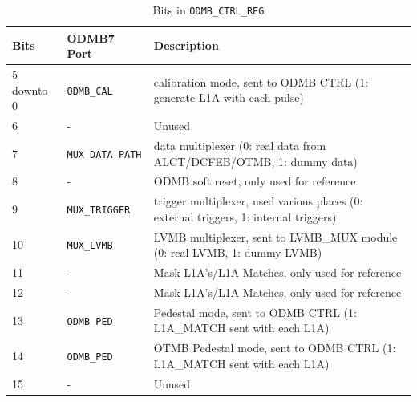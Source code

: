 \documentclass[10pt,a4paper]{article}
\begin{document}
\begin{table}[H]
\centering
\begin{tabular}{|l|l|l|} \hline
Bits& ODMB7 Port& Description\\ \hline
5 downto 0& \texttt{ODMB\_CAL}& calibration mode, sent to ODMB CTRL (1: generate L1A with each pulse)\\ \hline
6& -& Unused \\ \hline
7& \texttt{MUX\_DATA\_PATH}& data multiplexer (0: real data from ALCT/DCFEB/OTMB, 1: dummy data)\\ \hline
8& -& ODMB soft reset, only used for reference\\ \hline
9& \texttt{MUX\_TRIGGER}& trigger multiplexer, used various places (0: external triggers, 1: internal triggers)\\ \hline 
10& \texttt{MUX\_LVMB}& LVMB multiplexer, sent to LVMB\_MUX module (0: real LVMB, 1: dummy LVMB)\\ \hline
11& -& Mask L1A's/L1A Matches, only used for reference \\ \hline
12& -& Mask L1A's/L1A Matches, only used for reference \\ \hline
13& \texttt{ODMB\_PED}&  Pedestal mode, sent to ODMB CTRL (1: L1A\_MATCH sent with each L1A)\\ \hline 
14& \texttt{ODMB\_PED}&  OTMB Pedestal mode, sent to ODMB CTRL (1: L1A\_MATCH sent with each L1A)\\ \hline
15& -& Unused \\ \hline	
\end{tabular}
\caption{Bits in \texttt{ODMB\_CTRL\_REG}}
\label{tab:odmbctrlbits}
\end{table}
\end{document}
